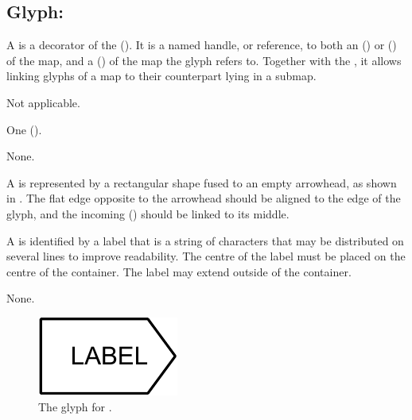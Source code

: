 
\subsection{Glyph: }
\label{sec:submapTerminal}

A  is a decorator of the  ().
It is a named handle, or reference, to both an  () or  () of the map, and a  () of the map the  glyph refers to.
Together with the , it allows linking glyphs of a map to their counterpart lying in a submap.

\begin{glyphDescription}

\glyphSboTerm Not applicable.


\glyphIncoming
One  ().



\glyphOutgoing
None.


\glyphContainer A  is represented by a rectangular shape fused to an empty arrowhead, as shown in .
The flat edge opposite to the arrowhead should be aligned to the edge of the  glyph, and the incoming  () should be linked to its middle.

\glyphLabel A  is identified by a label that is  a string of characters that may be distributed on several lines to improve readability.
The centre of the label must be placed on the centre of the container.
The label may extend outside of the container.

\glyphAux
None.

\end{glyphDescription}


\begin{figure}[H]
  \centering
  \includegraphics{images/submapterminal}
  \caption{The \PD glyph for .}
  \label{fig:submapTerminal}
\end{figure}


